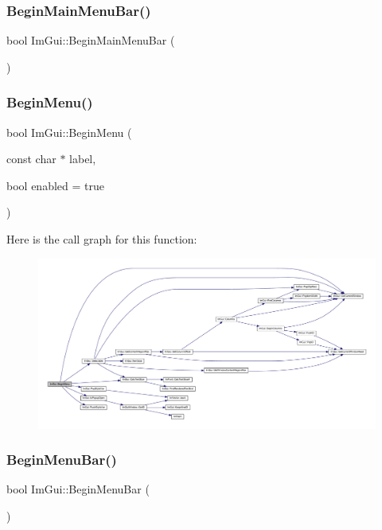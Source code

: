 \subsubsection{\texorpdfstring{Begin\+Main\+Menu\+Bar()}{BeginMainMenuBar()}}
{\footnotesize\ttfamily bool Im\+Gui\+::\+Begin\+Main\+Menu\+Bar (\begin{DoxyParamCaption}{ }\end{DoxyParamCaption})}

\mbox{\label{namespace_im_gui_a1e55711a21f97d5dff919d697d3a7201}} 
\subsubsection{\texorpdfstring{Begin\+Menu()}{BeginMenu()}}
{\footnotesize\ttfamily bool Im\+Gui\+::\+Begin\+Menu (\begin{DoxyParamCaption}\item[{const char $\ast$}]{label,  }\item[{bool}]{enabled = {\ttfamily true} }\end{DoxyParamCaption})}

Here is the call graph for this function\+:
\nopagebreak
\begin{figure}[H]
\begin{center}
\leavevmode
\includegraphics[width=350pt]{namespace_im_gui_a1e55711a21f97d5dff919d697d3a7201_cgraph}
\end{center}
\end{figure}
\mbox{\label{namespace_im_gui_a4852dff802922163fc747e2e0df5b88f}} 
\subsubsection{\texorpdfstring{Begin\+Menu\+Bar()}{BeginMenuBar()}}
{\footnotesize\ttfamily bool Im\+Gui\+::\+Begin\+Menu\+Bar (\begin{DoxyParamCaption}{ }\end{DoxyParamCaption})}

